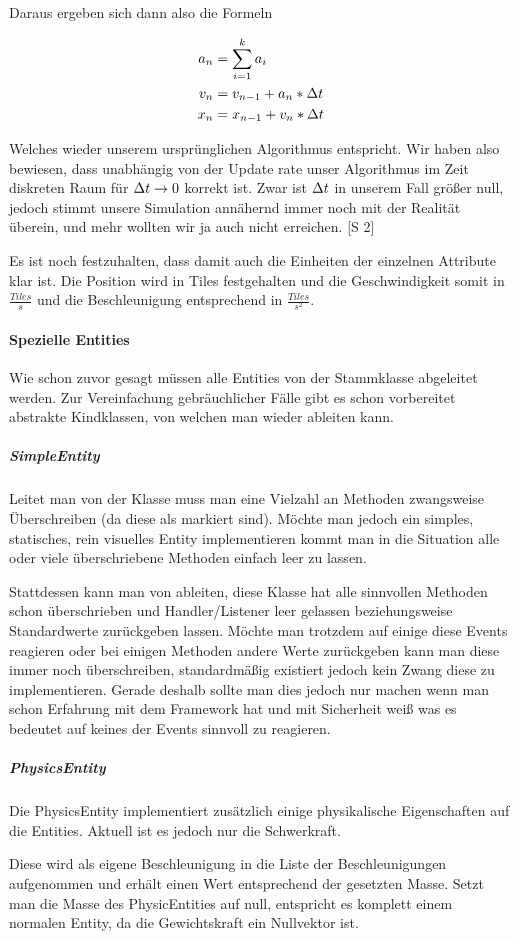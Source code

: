 Daraus ergeben sich dann also die Formeln

\begin{align*}
  a_n &= \sum_{i=1}^{k}{a_i}  \\
  v_n &= v_{n-1} + a_n * \Delta t  \\
  x_n &= x_{n-1} + v_n * \Delta t
\end{align*}

Welches wieder unserem ursprünglichen Algorithmus entspricht. Wir haben also bewiesen, dass unabhängig von der Update rate unser Algorithmus im Zeit diskreten Raum für $\Delta t \rightarrow 0$ korrekt ist. Zwar ist $\Delta t $ in unserem Fall größer null, jedoch stimmt unsere Simulation annähernd immer noch mit der Realität überein, und mehr wollten wir ja auch nicht erreichen. \cite{ACP}[S 2]

Es ist noch festzuhalten, dass damit auch die Einheiten der einzelnen Attribute klar ist. Die Position wird in Tiles festgehalten und die Geschwindigkeit somit in $\frac{Tiles}{s}$ und die Beschleunigung entsprechend in $\frac{Tiles}{s^2}$.

\paragraph{Spezielle Entities}

Wie schon zuvor gesagt müssen alle Entities von der Stammklasse  abgeleitet werden. Zur Vereinfachung gebräuchlicher Fälle gibt es schon vorbereitet abstrakte Kindklassen, von welchen man wieder ableiten kann.


\subparagraph{SimpleEntity}

Leitet man von der Klasse  muss man eine Vielzahl an Methoden zwangsweise Überschreiben (da diese als  markiert sind). Möchte man jedoch ein simples, statisches, rein visuelles Entity implementieren kommt man in die Situation alle oder viele überschriebene Methoden einfach leer zu lassen.

Stattdessen kann man von  ableiten, diese Klasse hat alle sinnvollen Methoden schon überschrieben und Handler/Listener leer gelassen beziehungsweise Standardwerte zurückgeben lassen. Möchte man trotzdem auf einige diese Events reagieren oder bei einigen Methoden andere Werte zurückgeben kann man diese immer noch überschreiben, standardmäßig existiert jedoch kein Zwang diese zu implementieren.
Gerade deshalb sollte man dies jedoch nur machen wenn man schon Erfahrung mit dem Framework hat und mit Sicherheit weiß was es bedeutet auf keines der Events sinnvoll zu reagieren.

\subparagraph{PhysicsEntity}

Die PhysicsEntity implementiert zusätzlich einige physikalische Eigenschaften auf die Entities. Aktuell ist es jedoch nur die Schwerkraft.

Diese wird als eigene Beschleunigung in die Liste der Beschleunigungen aufgenommen und erhält einen Wert entsprechend der gesetzten Masse. Setzt man die Masse des PhysicEntities auf null, entspricht es komplett einem normalen Entity, da die Gewichtskraft ein Nullvektor ist.